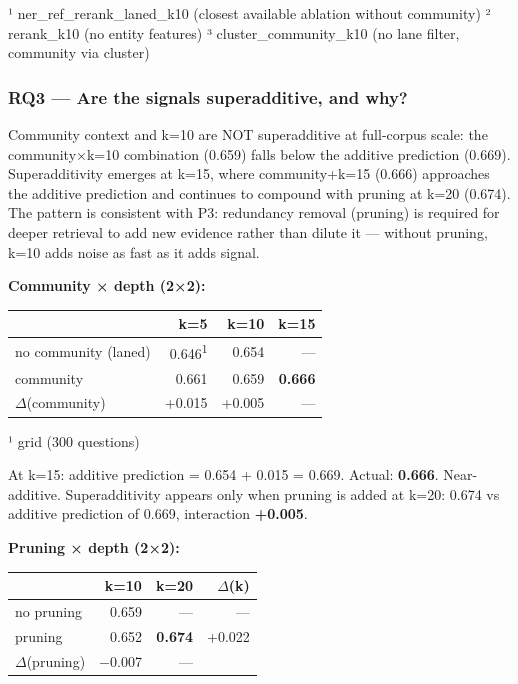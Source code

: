 ¹ ner\_ref\_rerank\_laned\_k10 (closest available ablation without community) ² rerank\_k10 (no entity features) ³ cluster\_community\_k10 (no lane filter, community via cluster)

\subsubsection{RQ3 --- Are the signals superadditive, and why?}\label{rq3-are-the-signals-superadditive-and-why}

Community context and k=10 are NOT superadditive at full-corpus scale: the community×k=10 combination (0.659) falls below the additive prediction (0.669). Superadditivity emerges at k=15, where community+k=15 (0.666) approaches the additive prediction and continues to compound with pruning at k=20 (0.674). The pattern is consistent with P3: redundancy removal (pruning) is required for deeper retrieval to add new evidence rather than dilute it --- without pruning, k=10 adds noise as fast as it adds signal.

\textbf{Community × depth (2×2):}

\begin{small}
\setlength{\tabcolsep}{4pt}
\begin{longtable}{lrrr}
\toprule
 & \textbf{k=5} & \textbf{k=10} & \textbf{k=15} \\
\midrule
\endhead
no community (laned) & 0.646\textsuperscript{1} & 0.654 & — \\
community & 0.661 & 0.659 & \textbf{0.666} \\
$\Delta$(community) & +0.015 & +0.005 & — \\
\bottomrule
\end{longtable}
\end{small}

¹ grid (300 questions)

At k=15: additive prediction = 0.654 + 0.015 = 0.669. Actual: \textbf{0.666}. Near-additive. Superadditivity appears only when pruning is added at k=20: 0.674 vs additive prediction of 0.669, interaction \textbf{+0.005}.

\textbf{Pruning × depth (2×2):}

\begin{small}
\setlength{\tabcolsep}{4pt}
\begin{longtable}{lrrr}
\toprule
 & \textbf{k=10} & \textbf{k=20} & \textbf{$\Delta$(k)} \\
\midrule
\endhead
no pruning & 0.659 & — & — \\
pruning & 0.652 & \textbf{0.674} & +0.022 \\
$\Delta$(pruning) & $-$0.007 & — & \\
\bottomrule
\end{longtable}
\end{small}

